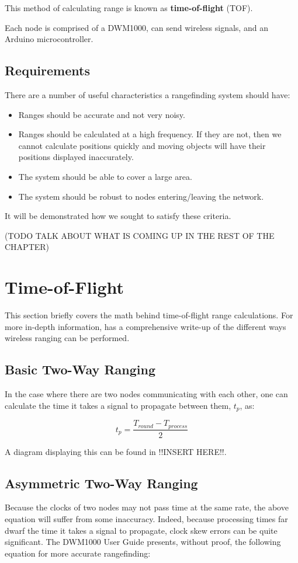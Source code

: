 This method of calculating range is known as \textbf{time-of-flight} (TOF).

Each node is comprised of a DWM1000, can send wireless signals, and an Arduino microcontroller.

\subsection{Requirements}
There are a number of useful characteristics a rangefinding system should have:
\begin{itemize}
	\item Ranges should be accurate and not very noisy.
	\item Ranges should be calculated at a high frequency. If they are not, then we cannot calculate positions quickly and moving objects will have their positions displayed inaccurately.
	\item The system should be able to cover a large area. 
	\item The system should be robust to nodes entering/leaving the network. 
\end{itemize}

It will be demonstrated how we sought to satisfy these criteria.

(TODO TALK ABOUT WHAT IS COMING UP IN THE REST OF THE CHAPTER)

\section{Time-of-Flight}
This section briefly covers the math behind time-of-flight range calculations. For more in-depth information, \textcite{DW1000UserManual} has a comprehensive write-up of the different ways wireless ranging can be performed.

\subsection{Basic Two-Way Ranging}
In the case where there are two nodes communicating with each other, one can calculate the time it takes a signal to propagate between them, $t_p$, as:

\[
	t_p = \frac{T_{round} - T_{process}}{2}
\]

A diagram displaying this can be found in !!INSERT HERE!!.

\subsection{Asymmetric Two-Way Ranging}
Because the clocks of two nodes may not pass time at the same rate, the above equation will suffer from some inaccuracy. Indeed, because processing times far dwarf the time it takes a signal to propagate, clock skew errors can be quite significant. The DWM1000 User Guide presents, without proof, the following equation for more accurate rangefinding:

